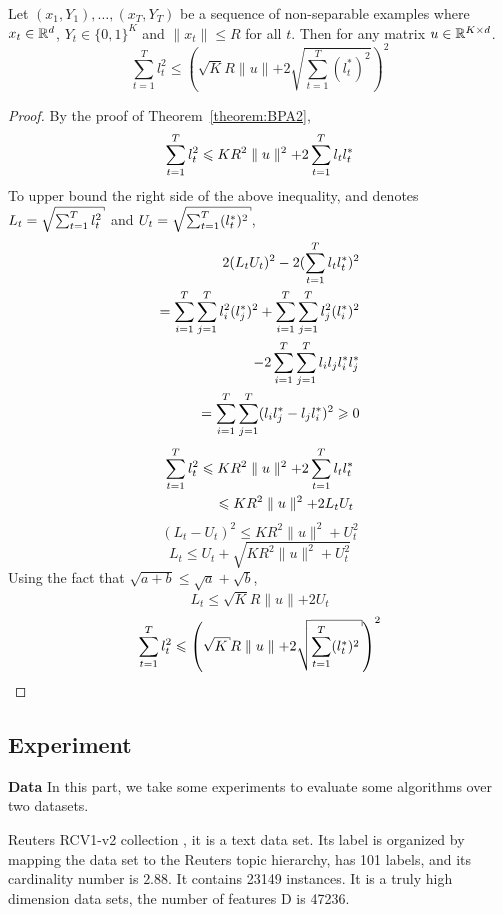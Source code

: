 \begin{theo}
\label{theorem:BPA2}
Let $(x_1,Y_1),\dots, (x_T,Y_T)$ be a sequence of non-separable examples
where $x_t\in \mathbb{R}^d$, $Y_t\in \{0,1\}^K$ and
$\parallel{x_t}\parallel \leqslant R$ for all $t$. Then for any matrix $u\in \mathbb{R}^{K\times d}$. 
\begin{equation}
\label{equa:mlBPA}
\sum_{t=1}^{T}l_t^2 \leqslant \left( \sqrt{K} R  \parallel{u}\parallel + 2\sqrt{\sum_{t=1}^{T}(l_t^{\ast})^2}\right)^2
\end{equation}
\end{theo}
\begin{proof}
By the proof of Theorem~\ref{theorem:BPA2},
\[\sum_{t=1}^{T} l_t^2 \leqslant KR^2\parallel{u}\parallel^2 + 2\sum_{t=1}^{T} l_t l_t^{\ast}\]
To upper bound the right side of the above inequality, and denotes $L_t = \sqrt{\sumt l_t^2}$ and $U_t = \sqrt{\sumt (l_t^{\ast})^2}$,
\[
\begin{split}
2(L_t U_t)^2 - 2(\sum_{t=1}^{T} l_t l_t^{\ast})^2 \\
=\sum_{i=1}^T \sum_{j=1}^T l_i^2 (l_j^{\ast})^2 + \sum_{i=1}^T \sum_{j=1}^{T}l_j^2(l_i^{\ast})^2 \\
- 2\sum_{i=1}^T\sum_{j=1}^T l_i l_j l_i^{\ast} l_j^{\ast} \\
= \sum_{i=1}^T\sum_{j=1}^T (l_i l_j^{\ast} - l_j l_i^{\ast})^2 \geqslant 0
\end{split}
\]
\[
\begin{split}
\sum_{t=1}^{T} l_t^2 \leqslant K R^2 \parallel{u}\parallel^2 + 2\sum_{t=1}^{T} l_t l_t^{\ast} \\
\leqslant K R^2 \parallel{u}\parallel^2 + 2 L_t U_t
\end{split}
\]
\[(L_t-U_t)^2 \leqslant K R^2 \parallel{u}\parallel^2 + U_t^2\]
\[L_t \leqslant U_t + \sqrt{K R^2 \parallel{u}\parallel^2 + U_t^2}
\]
Using the fact that $\sqrt{a+b} \leqslant \sqrt{a} +\sqrt{b}$,
\[L_t \leqslant \sqrt{K}R\parallel{u}\parallel + 2U_t\]
\[\sumt l_t^2 \leqslant \left(\sqrt{K}R\parallel{u}\parallel+2\sqrt{\sumt(l_t^{\ast})^2}\right)^2\]
\end{proof}

\subsection{Experiment}
\label{subsec:BPASE}

\textbf{Data}
In this part, we take some experiments to evaluate some algorithms over two datasets. 

Reuters RCV1-v2 collection \cite{lewis2004rcv1}, it is a text data set. Its label is organized by mapping the data set to the Reuters topic hierarchy, has 101 labels, and its cardinality number is $2.88$. It contains 23149 instances. It is a truly high dimension data sets, the number of features D is 47236. 

